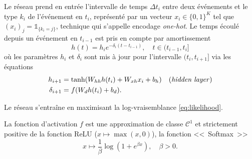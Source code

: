 \documentclass[../main.tex]{subfiles}
\begin{document}
Le réseau prend en entrée l'intervalle de temps $\Delta t_i$ entre deux événements et le type $k_i$ de l'événement en $t_i$, représenté par un vecteur $x_i\in{\{0,1\}}^K$ tel que $(x_i)_j = \mathds{1}_{\{k_i = j\}}$, technique qui s'appelle encodage \textit{one-hot}\footnotemark.
Le temps écoulé depuis un événement en $t_{i-1}$ est pris en compte par amortissement
\begin{equation}
h(t) = h_{i}e^{-\delta_i(t-t_{i-1})},\quad t\in(t_{i-1},t_i]
\end{equation}
où les paramètres $h_i$ et $\delta_i$ sont mis à jour pour l'intervalle $(t_i,t_{i+1}]$ via les équations
\begin{subequations}
\begin{align}
	h_{i+1} &= \tanh(W_{hh}h(t_i) + W_{xh}x_i + b_{h})\quad\text{(\textit{hidden layer})} \\
	\delta_{i+1} &= f(W_dh(t_i) + b_d).
\end{align}
\end{subequations}

Le réseau s'entraîne en maximisant la log-vraisemblance \eqref{eq:likelihood}.

La fonction d'activation $f$ est une approximation de classe $\mathcal C^1$ et strictement positive de la fonction ReLU ($x\mapsto \max(x,0)$), la fonction <<~Softmax~>>
\[
x\mapsto \frac{1}{\beta}\log(1+e^{\beta x}),\quad\beta > 0.
\]
\end{document}
